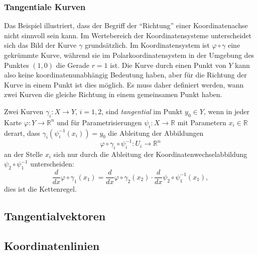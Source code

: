 


\subsubsection{Tangentiale Kurven}
Das Beispiel illustriert, dass der Begriff der ``Richtung'' einer
Koordinatenachse nicht sinnvoll sein kann.
Im Wertebereich der Koordinatensysteme unterscheidet sich das Bild
der Kurve $\gamma$ grundsätzlich.
Im Koordinatensystem ist $\varphi\circ\gamma$ eine gekrümmte Kurve,
während sie im Polarkoordinatensystem in der Umgebung des Punktes
$(1,0)$ die Gerade $r=1$ ist.
Die Kurve durch einen Punkt von $Y$ kann also keine koordinatenunabhängig
Bedeutung haben, aber für die Richtung der Kurve in einem Punkt ist
dies möglich.
Es muss daher definiert werden, wann zwei Kurven die gleiche Richtung
in einem gemeinsamen Punkt haben.



\begin{definition}
Zwei Kurven $\gamma_i\colon X\to Y$, $i=1,2$, sind
{\em tangential} im Punkt $y_0\in Y$, wenn in jeder Karte
$\varphi\colon Y\to\mathbb{R}^n$ und für Parametrisierungen
$\psi_i\colon X\to \mathbb{R}$ mit Parametern $x_i\in\mathbb{R}$ derart,
dass $\gamma_i(\psi_i^{-1}(x_i)) = y_0$ die Ableitung der Abbildungen
\[
\varphi
\circ
\gamma_i
\circ
\psi_i^{-1}
\colon
U_i\to\mathbb{R}^n
\]
an der Stelle $x_i$ sich nur durch die Ableitung der
Koordinatenwechselabbildung $\psi_2\circ\psi_1^{-1}$ unterscheiden:
\begin{equation}
\frac{d}{dx}
\varphi\circ\gamma_1(x_1)
=
\frac{d}{dx}
\varphi\circ\gamma_2(x_2)
\cdot
\frac{d}{dx}
\psi_2\circ\psi_1^{-1}(x_1),
\label{buch:koordinaten:tangentialvektoren:eqn:tangential}
\end{equation}
dies ist die Kettenregel.
\end{definition}

%
%
\subsection{Tangentialvektoren}

%
%
\subsection{Koordinatenlinien}



